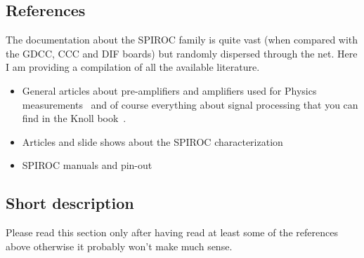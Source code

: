 \subsection{References}
The documentation about the SPIROC family is quite vast (when compared with
the GDCC, CCC and DIF boards) but randomly dispersed through the
net. Here I am providing a compilation of all the available
literature.

\begin{itemize}
\item General articles about pre-amplifiers and amplifiers used for
  Physics
  measurements~\cite{Hamamatsu:2001,Bertuccio:1996,Lioliou:2015,Ortec}
  and of course everything about signal processing that you can find
  in the Knoll book~\cite{Knoll:2010radiation}.
\item Articles and slide shows about the SPIROC
  characterization~\cite{Callier:2008,Callier:2009,Fabbri:2009,%
    Callier:2013,Callier:2015}
\item SPIROC manuals and
  pin-out~\cite{SPIROC2Dpinlist,SPIROC2Ddatasheet,SPIROC:OMEGA}
\end{itemize}

\subsection{Short description}
Please read this section only after having read at least some of the
references above otherwise it probably won't make much sense.

